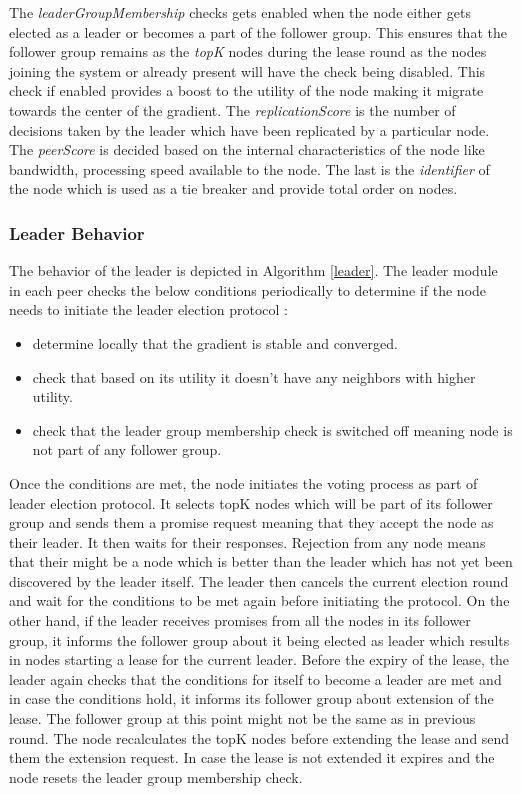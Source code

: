 \documentclass[12pt,a4paper,twoside,openright]{book}
\begin{document}
The \textit{leaderGroupMembership} checks gets enabled when the node either gets elected as a leader or becomes a part of the follower group. This ensures that the follower group remains as the \textit{topK} nodes during the lease round as the nodes joining the system or already present will have the check being disabled. This check if enabled provides a boost to the utility of the node making it migrate towards the center of the gradient. The \textit{replicationScore} is the number of decisions taken by the leader which have been replicated by a particular node. The \textit{peerScore} is decided based on the internal characteristics of the node like bandwidth, processing speed available to the node. The last is the \textit{identifier} of the node which is used as a tie breaker and provide total order on nodes. 


\subsubsection{Leader Behavior}

The behavior of the leader is depicted in Algorithm \ref{leader}. The leader module in each peer checks the below conditions periodically to determine if the node needs to initiate the leader election protocol :

\begin{itemize}
\item determine locally that the gradient is stable and converged.
\item check that based on its utility it doesn't have any neighbors with higher utility.
\item check that the leader group membership check is switched off meaning node is not part of any follower group.
\end{itemize}

Once the conditions are met, the node initiates the voting process as part of leader election protocol. It selects topK nodes which will be part of  its follower group and sends them a promise request meaning that they accept the node as their leader. It then waits for their responses. Rejection from any node means that their might be a node which is better than the leader which has not yet been discovered by the leader itself. The leader then cancels the current election round and wait for the conditions to be met again before initiating the protocol.
On the other hand, if the leader receives promises from all the nodes in its follower group, it informs the follower group about it being elected as leader which results in nodes starting a lease for the current leader.  Before the expiry of the lease, the leader again checks that the conditions for itself to become a leader are met and in case the conditions hold, it informs its follower group about extension of the lease. The follower group at this point might not be the same as in previous round. The node recalculates the topK nodes before extending the lease and send them the extension request. In case the lease is not extended it expires and the node resets the leader group membership check.
\end{document}

